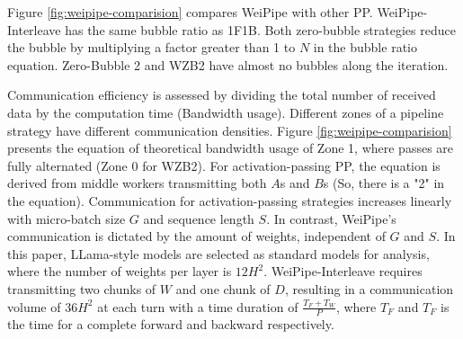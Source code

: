 \documentclass[sigplan,review]{acmart}
\begin{document}
Figure \ref{fig:weipipe-comparision} compares WeiPipe with other PP. WeiPipe-Interleave has the same bubble ratio as 1F1B. Both zero-bubble strategies reduce the bubble by multiplying a factor greater than 1 to $N$ in the bubble ratio equation. Zero-Bubble 2 and WZB2 have almost no bubbles along the iteration. 


Communication efficiency is assessed by dividing the total number of received data by the computation time (Bandwidth usage). Different zones of a pipeline strategy have different communication densities. Figure \ref{fig:weipipe-comparision} presents the equation of theoretical bandwidth usage of Zone 1, where passes are fully alternated (Zone 0 for WZB2). For activation-passing PP, the equation is derived from middle workers transmitting both $A$s and $B$s (So, there is a "2" in the equation). Communication for activation-passing strategies increases linearly with micro-batch size $G$ and sequence length $S$. In contrast, WeiPipe’s communication is dictated by the amount of weights, independent of $G$ and $S$. In this paper, LLama-style models are selected as standard models for analysis, where the number of weights per layer is $12H^2$. WeiPipe-Interleave requires transmitting two chunks of $W$ and one chunk of $D$, resulting in a communication volume of $36H^2$ at each turn with a time duration of $\frac{T_F + T_W}{P}$, where $T_F$ and $T_F$ is the time for a complete forward and backward respectively.



\end{document}
